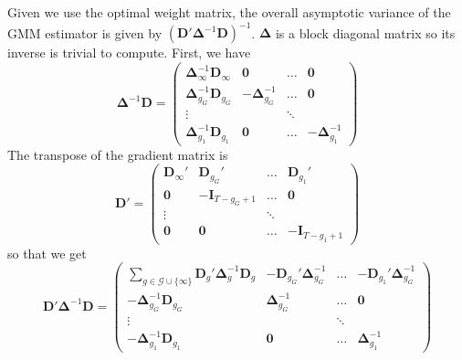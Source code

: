 \documentclass[12pt]{article}
\begin{document}
Given we use the optimal weight matrix, the overall asymptotic variance of the GMM estimator is given by $(\bm D' \bm \Delta^{-1} \bm D)^{-1}$. $\bm\Delta$ is a block diagonal matrix so its inverse is trivial to compute. First, we have
\begin{equation*}
    \bm \Delta^{-1} \bm D = 
    \begin{pmatrix}
        \bm \Delta_{\infty}^{-1} \bm D_{\infty} & \bm 0 &  \hdots & \bm 0\\
        \bm \Delta_{g_G}^{-1} \bm D_{g_G} & -\bm \Delta_{g_G}^{-1} & \hdots & \bm 0\\
        \vdots & & \ddots &\\
        \bm \Delta_{g_1}^{-1} \bm D_{g_1} & \bm 0 & \hdots & - \bm \Delta_{g_1}^{-1}
    \end{pmatrix}
\end{equation*}
The transpose of the gradient matrix is
\begin{equation*}
    \bm D' =
    \begin{pmatrix}
        \bm D_{\infty}' & \bm D_{g_G}' & \hdots & \bm D_{g_1}'\\
        \bm 0 & -\bm I_{T-g_G + 1} & \hdots & \bm 0\\
        \vdots & & \ddots & \\
        \bm 0 & \bm 0 & \hdots & - \bm I_{T-g_1 + 1}
    \end{pmatrix}
\end{equation*}
so that we get
\begin{equation*}
    \bm D' \bm \Delta^{-1} \bm D = 
    \begin{pmatrix}
        \sum_{g \in \mathcal{G}\cup\{\infty\}} \bm D_g' \bm \Delta_g^{-1} \bm D_g & -\bm D_{g_G}' \bm \Delta_{g_G}^{-1} & \hdots & - \bm D_{g_1}' \bm \Delta_{g_G}^{-1}\\
        -\bm \Delta_{g_G}^{-1} \bm D_{g_G} & \bm \Delta_{g_G}^{-1} & \hdots & \bm 0\\
        \vdots & & \ddots &\\
        -\bm \Delta_{g_1}^{-1} \bm D_{g_1} & \bm 0 & \hdots & \bm \Delta_{g_1}^{-1}
    \end{pmatrix}
\end{equation*}
\end{document}
